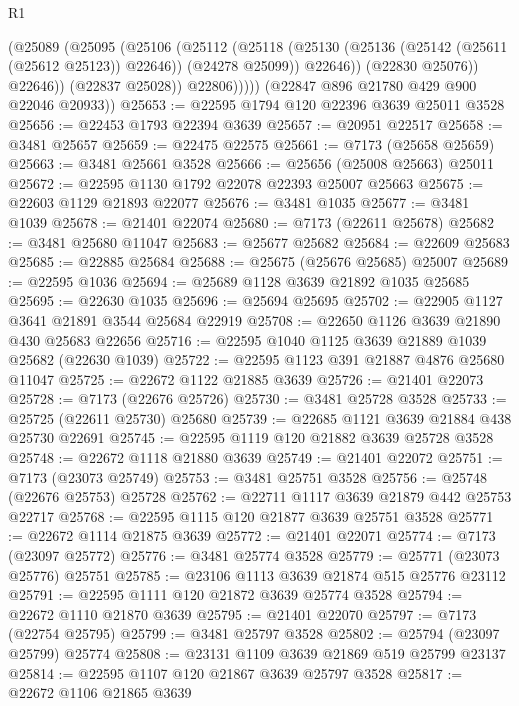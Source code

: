 \begin{lexlean}{R1}
\begin{coremodule}
                  (@25089
                    (@25095
                      (@25106
                        (@25112
                          (@25118
                            (@25130
                              (@25136 (@25142 (@25611 (@25612 @25123)) @22646))
                              (@24278 @25099))
                            @22646))
                        (@22830 @25076))
                      @22646))
                  (@22837 @25028))
                @22806)))))
      (@22847 @896 @21780 @429 @900 @22046 @20933))
@25653 := @22595 @1794 @120 @22396 @3639 @25011 @3528
@25656 := @22453 @1793 @22394 @3639
@25657 := @20951 @22517
@25658 := @3481 @25657
@25659 := @22475 @22575
@25661 := @7173 (@25658 @25659)
@25663 := @3481 @25661 @3528
@25666 := @25656 (@25008 @25663) @25011
@25672 := @22595 @1130 @1792 @22078 @22393 @25007 @25663
@25675 := @22603 @1129 @21893 @22077
@25676 := @3481 @1035
@25677 := @3481 @1039
@25678 := @21401 @22074
@25680 := @7173 (@22611 @25678)
@25682 := @3481 @25680 @11047
@25683 := @25677 @25682
@25684 := @22609 @25683
@25685 := @22885 @25684
@25688 := @25675 (@25676 @25685) @25007
@25689 := @22595 @1036
@25694 := @25689 @1128 @3639 @21892 @1035 @25685
@25695 := @22630 @1035
@25696 := @25694 @25695
@25702 := @22905 @1127 @3641 @21891 @3544 @25684 @22919
@25708 := @22650 @1126 @3639 @21890 @430 @25683 @22656
@25716 := @22595 @1040 @1125 @3639 @21889 @1039 @25682 (@22630 @1039)
@25722 := @22595 @1123 @391 @21887 @4876 @25680 @11047
@25725 := @22672 @1122 @21885 @3639
@25726 := @21401 @22073
@25728 := @7173 (@22676 @25726)
@25730 := @3481 @25728 @3528
@25733 := @25725 (@22611 @25730) @25680
@25739 := @22685 @1121 @3639 @21884 @438 @25730 @22691
@25745 := @22595 @1119 @120 @21882 @3639 @25728 @3528
@25748 := @22672 @1118 @21880 @3639
@25749 := @21401 @22072
@25751 := @7173 (@23073 @25749)
@25753 := @3481 @25751 @3528
@25756 := @25748 (@22676 @25753) @25728
@25762 := @22711 @1117 @3639 @21879 @442 @25753 @22717
@25768 := @22595 @1115 @120 @21877 @3639 @25751 @3528
@25771 := @22672 @1114 @21875 @3639
@25772 := @21401 @22071
@25774 := @7173 (@23097 @25772)
@25776 := @3481 @25774 @3528
@25779 := @25771 (@23073 @25776) @25751
@25785 := @23106 @1113 @3639 @21874 @515 @25776 @23112
@25791 := @22595 @1111 @120 @21872 @3639 @25774 @3528
@25794 := @22672 @1110 @21870 @3639
@25795 := @21401 @22070
@25797 := @7173 (@22754 @25795)
@25799 := @3481 @25797 @3528
@25802 := @25794 (@23097 @25799) @25774
@25808 := @23131 @1109 @3639 @21869 @519 @25799 @23137
@25814 := @22595 @1107 @120 @21867 @3639 @25797 @3528
@25817 := @22672 @1106 @21865 @3639

\end{coremodule}
\end{lexlean}
